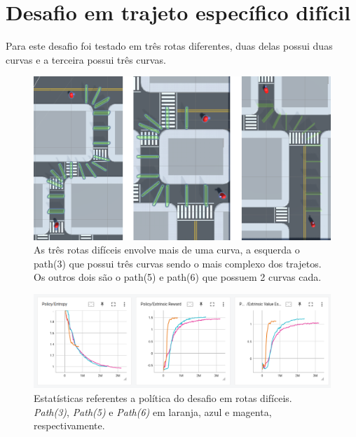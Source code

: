 \section{Desafio em trajeto específico difícil}
Para este desafio foi testado em três rotas diferentes, duas delas possui duas curvas e a terceira possui três curvas.

\begin{figure}[h]
    \centering
    \includegraphics{figs/treinos/desafio-dificil/rotas.png}
    \caption{As três rotas difíceis envolve mais de uma curva, a esquerda o path(3) que possui três curvas sendo o mais complexo dos trajetos. Os outros dois são o path(5) e path(6) que possuem 2 curvas cada.}
\end{figure}

\begin{figure}[h]
    \centering
    \includegraphics[scale=0.35]{figs/treinos/desafio-dificil/politica.png}
    \caption{Estatísticas referentes a política do desafio em rotas difíceis. \textit{Path(3)}, \textit{Path(5)} e \textit{Path(6)} em laranja, azul e magenta, respectivamente.}
\end{figure}

